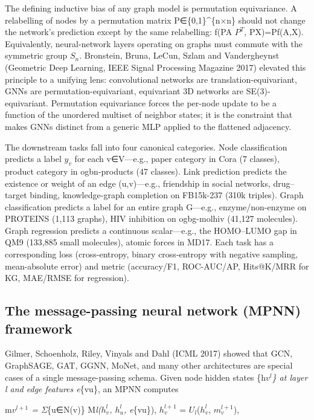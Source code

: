 The defining inductive bias of any graph model is permutation equivariance. A relabelling of nodes by a permutation matrix P∈\{0,1\}\^{}\{n×n\} should not change the network's prediction except by the same relabelling: f(PA \(P^T\), PX)=Pf(A,X). Equivalently, neural-network layers operating on graphs must commute with the symmetric group \(S_n\). Bronstein, Bruna, LeCun, Szlam and Vandergheynst (Geometric Deep Learning, IEEE Signal Processing Magazine 2017) elevated this principle to a unifying lens: convolutional networks are translation-equivariant, GNNs are permutation-equivariant, equivariant 3D networks are SE(3)-equivariant. Permutation equivariance forces the per-node update to be a function of the unordered multiset of neighbor states; it is the constraint that makes GNNs distinct from a generic MLP applied to the flattened adjacency.

The downstream tasks fall into four canonical categories. Node classification predicts a label \(y_v\) for each v∈V---e.g., paper category in Cora (7 classes), product category in ogbn-products (47 classes). Link prediction predicts the existence or weight of an edge (u,v)---e.g., friendship in social networks, drug--target binding, knowledge-graph completion on FB15k-237 (310k triples). Graph classification predicts a label for an entire graph G---e.g., enzyme/non-enzyme on PROTEINS (1,113 graphs), HIV inhibition on ogbg-molhiv (41,127 molecules). Graph regression predicts a continuous scalar---e.g., the HOMO--LUMO gap in QM9 (133,885 small molecules), atomic forces in MD17. Each task has a corresponding loss (cross-entropy, binary cross-entropy with negative sampling, mean-absolute error) and metric (accuracy/F1, ROC-AUC/AP, Hits@K/MRR for KG, MAE/RMSE for regression).

\subsection{The message-passing neural network (MPNN) framework}\label{the-message-passing-neural-network-mpnn-framework}

Gilmer, Schoenholz, Riley, Vinyals and Dahl (ICML 2017) showed that GCN, GraphSAGE, GAT, GGNN, MoNet, and many other architectures are special cases of a single message-passing schema. Given node hidden states \{h\emph{\(v^l\)\} at layer l and edge features e}\{vu\}, an MPNN computes

m\emph{\(v^{l+1}\) = Σ}\{u∈N(v)\} M\emph{l(\(h_v^l\), \(h_u^l\), e}\{vu\}),
\(h_v^{l+1}\) = \(U_l\)(\(h_v^l\), \(m_v^{l+1}\)),

